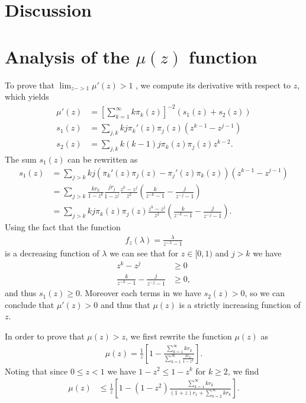 \documentclass[a4paper]{article}
\begin{document}
\section{Discussion}


\appendix
\section{Analysis of the $\mu(z)$ function}
\label{Appendix: Fixpoint convergence}

To prove that $\lim_{z -> 1} \mu'(z) > 1$ , we compute its derivative with respect to $z$, which yields
\begin{align}
	\mu'(z) &= \left[\sum_{k = 1}^{\infty}k \pi_k(z)\right]^{-2} \left(s_1(z) + s_2(z)\right) \\
	s_1(z) &= \sum_{j, k}k j \pi_k'(z) \pi_j(z) \left( z^{k-1} -  z^{j-1}\right) \\
	s_2(z) &= \sum_{j, k} k (k - 1) j \pi_k(z) \pi_j(z) z^{k-2}.
\end{align}
The sum $s_1(z)$ can be rewritten as
\begin{align}
	s_1(z) &= \sum_{j > k} k j \left(\pi_k'(z) \pi_j(z) - \pi_j'(z) \pi_k(z)\right) \left(z^{k-1} -  z^{j-1}\right) \\
		&=\sum_{j > k} \frac{k r_k}{1 - z^k} \frac{j r_j}{1 - z^j} \frac{z^k - z^j}{z^2} \left(\frac{k}{z^{-k} - 1} - \frac{j}{z^{-j} - 1}\right)\\
		&=\sum_{j > k} k j \pi_k(z) \pi_j(z) \frac{z^k - z^j}{z^2} \left(\frac{k}{z^{-k} - 1} - \frac{j}{z^{-j} - 1}\right).
\end{align}
Using the fact that the function
\begin{align}
	f_z(\lambda) = \frac{\lambda}{z^{-\lambda} - 1}
\end{align}
is a decreasing function of $\lambda$ we can see that for $z \in [0, 1)$ and $j > k$ we have
\begin{align}
	z^k - z^j &\geq 0 \\
	\frac{k}{z^{-k} - 1} - \frac{j}{z^{-j} - 1} &\geq 0,
\end{align}
and thus $s_1(z) \geq 0$. Moreover each terms in we have $s_2(z) > 0$, so we can conclude that $\mu'(z) > 0$ and thus that $\mu(z)$ is a strictly increasing function of $z$.

In order to prove that $\mu(z) > z$, we first rewrite the function $\mu(z)$ as
\begin{align}
	\mu(z) = \frac{1}{z} \left[1 - \frac{\sum_{k=1}^\infty k r_k}{\sum_{k=1}^\infty \frac{k r_k}{1 - z^k}}\right].
\end{align}
Noting that since $0 \leq z < 1$ we have $1 - z^2 \leq 1 - z^k$ for $k \geq 2$, we find
\begin{align}
	\mu(z) &\leq \frac{1}{z} \left[1 - (1 - z^2)\frac{\sum_{k=1}^\infty k r_k}{(1 + z)r_1 + \sum_{k=2}^\infty k r_k}\right].
\end{align}

\printbibliography{}
\end{document}

